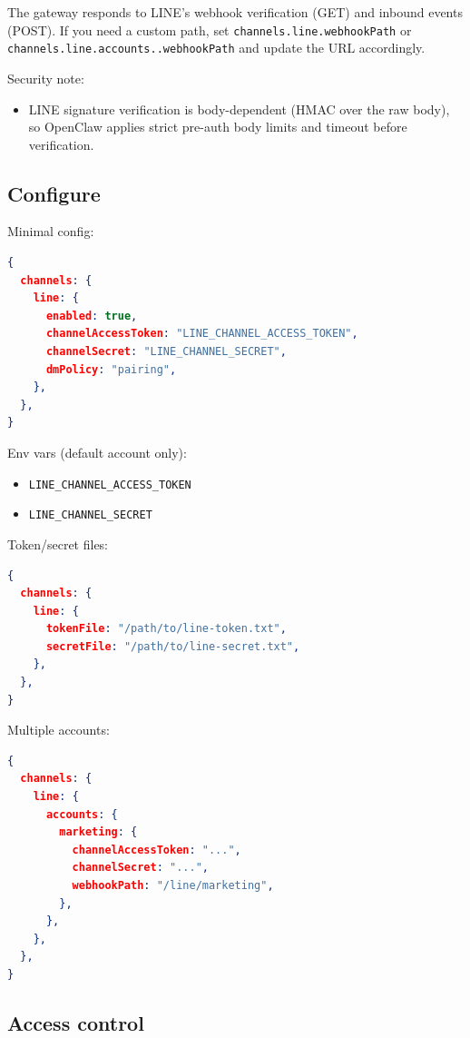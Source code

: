 The gateway responds to LINE’s webhook verification (GET) and inbound events (POST).
If you need a custom path, set \texttt{channels.line.webhookPath} or
\texttt{channels.line.accounts..webhookPath} and update the URL accordingly.

Security note:

\begin{itemize}
  \item LINE signature verification is body-dependent (HMAC over the raw body), so OpenClaw applies strict pre-auth body limits and timeout before verification.
\end{itemize}


\subsection{Configure}


Minimal config:

\begin{lstlisting}[language=json]
{
  channels: {
    line: {
      enabled: true,
      channelAccessToken: "LINE_CHANNEL_ACCESS_TOKEN",
      channelSecret: "LINE_CHANNEL_SECRET",
      dmPolicy: "pairing",
    },
  },
}
\end{lstlisting}


Env vars (default account only):

\begin{itemize}
  \item \texttt{LINE\_CHANNEL\_ACCESS\_TOKEN}
  \item \texttt{LINE\_CHANNEL\_SECRET}
\end{itemize}


Token/secret files:

\begin{lstlisting}[language=json]
{
  channels: {
    line: {
      tokenFile: "/path/to/line-token.txt",
      secretFile: "/path/to/line-secret.txt",
    },
  },
}
\end{lstlisting}


Multiple accounts:

\begin{lstlisting}[language=json]
{
  channels: {
    line: {
      accounts: {
        marketing: {
          channelAccessToken: "...",
          channelSecret: "...",
          webhookPath: "/line/marketing",
        },
      },
    },
  },
}
\end{lstlisting}


\subsection{Access control}


